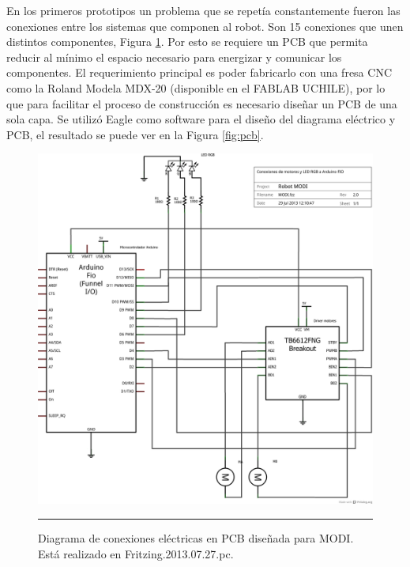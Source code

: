 En los primeros prototipos un problema que se repetía constantemente fueron las conexiones entre los sistemas que componen al robot. Son 15 conexiones que unen distintos componentes, Figura \ref{fig:Diagrama cables}. Por esto se requiere un PCB que permita reducir al mínimo el espacio necesario para energizar y comunicar los componentes. El requerimiento principal es poder fabricarlo con una fresa CNC como la Roland Modela MDX-20 (disponible en el FABLAB UCHILE), por lo que para facilitar el proceso de construcción es necesario diseñar un PCB de una sola capa. Se utilizó Eagle como software para el diseño del diagrama eléctrico y PCB, el resultado se puede ver en la Figura \ref{fig:pcb}.


\begin{figure}[htbp]
	\centering
		\includegraphics[width=\textwidth]{./Figures/modi/MODI_schem.png}
		\rule{35em}{0.5pt}
	\caption[Diagrama eléctrico de conexiones en PCB MODI]{Diagrama de conexiones eléctricas en PCB diseñada para MODI. Está realizado en Fritzing.2013.07.27.pc.}
	\label{fig:Diagrama cables}
\end{figure}	

